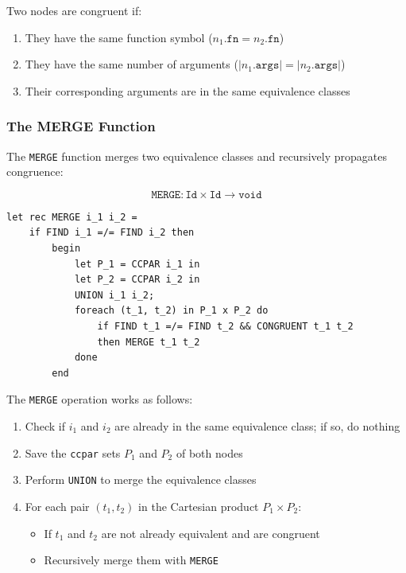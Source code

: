 \documentclass[11pt,a4paper]{article}
\theoremstyle{definition}
\theoremstyle{plain}
\theoremstyle{remark}
\begin{document}
Two nodes are congruent if:
\begin{enumerate}
    \item They have the same function symbol ($n_1.\texttt{fn} = n_2.\texttt{fn}$)
    \item They have the same number of arguments ($|n_1.\texttt{args}| = |n_2.\texttt{args}|$)
    \item Their corresponding arguments are in the same equivalence classes
\end{enumerate}

\subsubsection{The MERGE Function}

\begin{tcolorbox}[colback=purple!5!white,colframe=purple!75!black,title=\textbf{MERGE Operation}]
The \texttt{MERGE} function merges two equivalence classes and recursively propagates congruence:

\[
\texttt{MERGE} : \texttt{Id} \times \texttt{Id} \rightarrow \texttt{void}
\]

\begin{verbatim}
let rec MERGE i_1 i_2 = 
    if FIND i_1 =/= FIND i_2 then
        begin 
            let P_1 = CCPAR i_1 in 
            let P_2 = CCPAR i_2 in 
            UNION i_1 i_2;
            foreach (t_1, t_2) in P_1 x P_2 do 
                if FIND t_1 =/= FIND t_2 && CONGRUENT t_1 t_2 
                then MERGE t_1 t_2
            done 
        end
\end{verbatim}

The \texttt{MERGE} operation works as follows:
\begin{enumerate}
    \item Check if $i_1$ and $i_2$ are already in the same equivalence class; if so, do nothing
    \item Save the \texttt{ccpar} sets $P_1$ and $P_2$ of both nodes
    \item Perform \texttt{UNION} to merge the equivalence classes
    \item For each pair $(t_1, t_2)$ in the Cartesian product $P_1 \times P_2$:
    \begin{itemize}
        \item If $t_1$ and $t_2$ are not already equivalent and are congruent
        \item Recursively merge them with \texttt{MERGE}
    \end{itemize}
\end{enumerate}
\end{tcolorbox}
\end{document}

